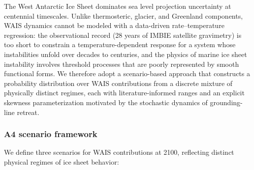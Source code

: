 \documentclass[11pt]{article}
\begin{document}
The West Antarctic Ice Sheet dominates sea level projection uncertainty at centennial timescales. Unlike thermosteric, glacier, and Greenland components, WAIS dynamics cannot be modeled with a data-driven rate--temperature regression: the observational record (28 years of IMBIE satellite gravimetry) is too short to constrain a temperature-dependent response for a system whose instabilities unfold over decades to centuries, and the physics of marine ice sheet instability involves threshold processes that are poorly represented by smooth functional forms. We therefore adopt a scenario-based approach that constructs a probability distribution over WAIS contributions from a discrete mixture of physically distinct regimes, each with literature-informed ranges and an explicit skewness parameterization motivated by the stochastic dynamics of grounding-line retreat.

\subsubsection{A4 scenario framework}

We define three scenarios for WAIS contributions at 2100, reflecting distinct physical regimes of ice sheet behavior:
\end{document}
